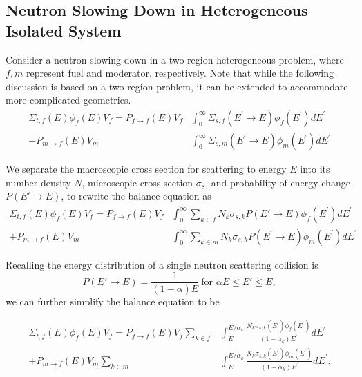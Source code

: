 \documentclass[10pt]{article}
\begin{document}
\subsection*{Neutron Slowing Down in Heterogeneous Isolated System}
Consider a neutron slowing down in a two-region heterogeneous problem, where $f,m$ represent fuel and moderator, respectively. Note that while the following discussion is based on a two region problem, it can be extended to accommodate more complicated geometries.
\begin{align}\Sigma_{t,f}(E)\phi_{f}(E)V_{f}=P_{f\rightarrow f}(E)V_{f}&\int_{0}^{\infty}\Sigma_{s,f}\left(E^{\prime}\rightarrow E\right)\phi_{f}\left(E^{\prime}\right)dE^{\prime}\\ + P_{m\rightarrow f}(E)V_{m}&\int_{0}^{\infty}\Sigma_{s,m}\left(E^{\prime}\rightarrow E\right)\phi_{m}\left(E^{\prime}\right)dE^{\prime}\end{align}

We separate the macroscopic cross section for scattering to energy $E$ into its number density $N$, microscopic cross section $\sigma_s$, and probability of energy change $P(E'\rightarrow E)$, to rewrite the balance equation as 
\begin{align}\Sigma_{t,f}(E)\phi_{f}(E)V_{f}=P_{f\rightarrow f}(E)V_{f}&\int_{0}^{\infty}\sum\limits_{k\in f}N_k\sigma_{s,k}P(E'\rightarrow E)\phi_{f}\left(E^{\prime}\right)dE^{\prime}\\ + P_{m\rightarrow f}(E)V_{m}&\int_{0}^{\infty}\sum\limits_{k\in m}N_k\sigma_{s,k}P\left(E^{\prime}\rightarrow E\right)\phi_{m}\left(E^{\prime}\right)dE^{\prime}\end{align}

Recalling the energy distribution of a single neutron scattering collision is 
\begin{equation}P(E'\rightarrow E)=\frac{1}{(1-\alpha)E}~\mbox{for }\alpha E\leq E'\leq E,\end{equation}
we can further simplify the balance equation to be

\begin{align}\Sigma_{t,f}(E)\phi_{f}(E)V_{f} = P_{f\rightarrow f}(E)V_{f}\sum\limits_{k\in f}&\int_{E}^{E/\alpha_{k}}\frac{N_{k}\sigma_{s,k}\left(E^{\prime}\right)\phi_{f}\left(E^{\prime}\right)}{\left(1-\alpha_{k}\right)E^{\prime}}dE^{\prime}  \\
+ P_{m\rightarrow f}(E)V_{m}\sum\limits_{k\in m}&\int_{E}^{E/\alpha_{k}}\frac{N_{k}\sigma_{s,k}\left(E^{\prime}\right)\phi_{m}\left(E^{\prime}\right)}{\left(1-\alpha_{k}\right)E^{\prime}}dE^{\prime}.\label{eq:hetero-balance}\end{align}
\end{document}
